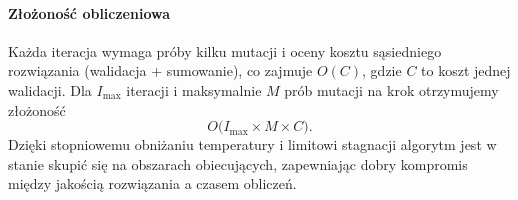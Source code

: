 \paragraph{Złożoność obliczeniowa}  
Każda iteracja wymaga próby kilku mutacji i oceny kosztu sąsiedniego rozwiązania (walidacja + sumowanie), co zajmuje $O(C)$, gdzie $C$ to koszt jednej walidacji. Dla $I_{\max}$ iteracji i maksymalnie $M$ prób mutacji na krok otrzymujemy złożoność
\[
  O\bigl(I_{\max} \times M \times C\bigr).
\]
Dzięki stopniowemu obniżaniu temperatury i limitowi stagnacji algorytm jest w stanie skupić się na obszarach obiecujących, zapewniając dobry kompromis między jakością rozwiązania a czasem obliczeń.  
